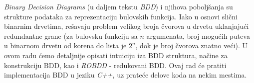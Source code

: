 \emph{Binary Decision Diagrams} (u daljem tekstu \emph{BDD}) i njihova pobolj\v{s}anja su strukture podataka za reprezentaciju bulovskih funkcija. Iako u osnovi sli\v{c}ni binarnim drvetima, re\v{s}avaju problem velikog broja \v{c}vorova u drvetu uklanjaju\'c{}i redundantne grane (za bulovsku funkciju sa $n$ argumenata, broj mogu\'c{}ih puteva u binarnom drvetu od korena do lista je $2^{n}$, dok je broj \v{c}vorova znatno ve\'c{}i). U ovom radu \'c{}emo detaljnije opisati intuiciju iza BDD struktura, na\v{c}ine za konstrukciju BDD, kao i \emph{ROBDD} - redukovani BDD. Ovaj rad \'c{}e pratiti implementacija BDD u jeziku \emph{C++}, uz prate\'c{}e delove koda na nekim mestima. 
